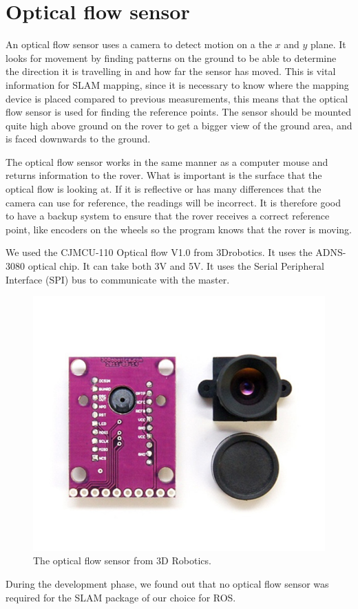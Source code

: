 \clearpage
\section{Optical flow sensor}

An optical flow sensor uses a camera to detect motion on a the $x$ and $y$ plane. It looks for movement by finding patterns on the ground to be able to determine the direction it is travelling in and how far the sensor has moved. This is vital information for SLAM mapping, since it is necessary to know where the mapping device is placed compared to previous measurements, this means that the optical flow sensor is used for finding the reference points. The sensor should be mounted quite high above ground on the rover to get a bigger view of the ground area, and is faced downwards to the ground\cite{opti_using}.

The optical flow sensor works in the same manner as a computer mouse and returns information to the rover. What is important is the surface that the optical flow is looking at. If it is reflective or has many differences that the camera can use for reference, the readings will be incorrect. It is therefore good to have a backup system to ensure that the rover receives a correct reference point, like encoders on the wheels so the program knows that the rover is moving.

We used the CJMCU-110 Optical flow V1.0 from 3Drobotics. It uses the ADNS-3080 optical chip. It can take both 3V and 5V. It uses the Serial Peripheral Interface (SPI) bus to communicate with the master\cite{opti_datasheet}.

\begin{figure}[H]
	\centering
	\includegraphics[width=.3\linewidth]{images/optical.jpg}
	\caption{The optical flow sensor from 3D Robotics.}
\end{figure}

During the development phase, we found out that no optical flow sensor was required for the SLAM package of our choice for ROS.